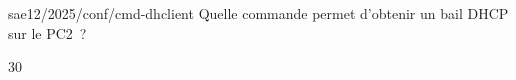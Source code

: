 \begin{question}{sae12/2025/conf/cmd-dhclient}
  Quelle commande permet d'obtenir un bail DHCP sur le PC2~?
  \begin{reponses}{3}{0}
  \end{reponses}
\end{question}
